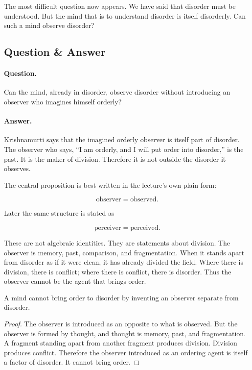 The most difficult question now appears. We have said that disorder must be understood. But the mind that is to understand disorder is itself disorderly. Can such a mind observe disorder?

\subsection{Question \& Answer}

\paragraph{Question.}
Can the mind, already in disorder, observe disorder without introducing an observer who imagines himself orderly?

\paragraph{Answer.}
Krishnamurti says that the imagined orderly observer is itself part of disorder. The observer who says, ``I am orderly, and I will put order into disorder,'' is the past. It is the maker of division. Therefore it is not outside the disorder it observes.

The central proposition is best written in the lecture's own plain form:

\begin{equation}
\text{observer}=\text{observed}.
\end{equation}

Later the same structure is stated as

\begin{equation}
\text{perceiver}=\text{perceived}.
\end{equation}

These are not algebraic identities. They are statements about division. The observer is memory, past, comparison, and fragmentation. When it stands apart from disorder as if it were clean, it has already divided the field. Where there is division, there is conflict; where there is conflict, there is disorder. Thus the observer cannot be the agent that brings order.

\begin{proposition}
A mind cannot bring order to disorder by inventing an observer separate from disorder.
\end{proposition}

\begin{proof}
The observer is introduced as an opposite to what is observed. But the observer is formed by thought, and thought is memory, past, and fragmentation. A fragment standing apart from another fragment produces division. Division produces conflict. Therefore the observer introduced as an ordering agent is itself a factor of disorder. It cannot bring order.
\end{proof}

